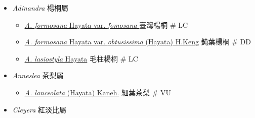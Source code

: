 
  \begin{itemize}
 \item[] \textit{Adinandra} 楊桐屬
                                
  \begin{itemize}
        \item[] \href{http://www.theplantlist.org/tpl1.1/search?q=Adinandra+formosana+var.+fomosana}{\textit{A. formosana} Hayata var. \textit{fomosana} }   臺灣楊桐  \# LC
        \item[] \href{http://www.theplantlist.org/tpl1.1/search?q=Adinandra+formosana+var.+obtusissima}{\textit{A. formosana} Hayata var. \textit{obtusissima} (Hayata) H.Keng}   鈍葉楊桐  \# DD
        \item[] \href{http://www.theplantlist.org/tpl1.1/search?q=Adinandra+lasiostyla}{\textit{A. lasiostyla} Hayata}   毛柱楊桐  \# LC
  \end{itemize}
 \item[] \textit{Anneslea} 茶梨屬
                                
  \begin{itemize}
        \item[] \href{http://www.theplantlist.org/tpl1.1/search?q=Anneslea+lanceolata}{\textit{A. lanceolata} (Hayata) Kaneh.}   細葉茶梨  \# VU
  \end{itemize}
 \item[] \textit{Cleyera} 紅淡比屬
                                

\end{itemize}
